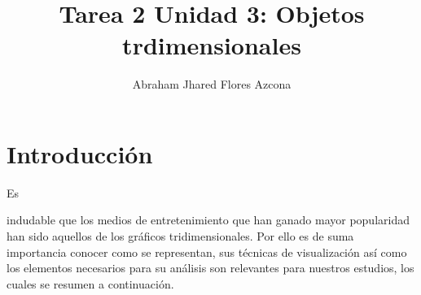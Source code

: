 \documentclass[stu, 12pt, letterpaper, donotrepeattitle, floatsintext, natbib]{apa7}
\title{\Large Tarea 2 Unidad 3: Objetos trdimensionales}
\author{Abraham Jhared Flores Azcona} %
\affiliation{Instituto Tecnológico de Tijuana}
\begin{document}
    \maketitle

    \renewcommand\contentsname{Contenido}
    \tableofcontents
    \renewcommand{\listfigurename}{Figuras}
    \listoffigures

    \newpage
    \section*{Introducción}
    Es \begin{justifying}
        indudable que los medios de entretenimiento que han ganado mayor popularidad han sido aquellos de los gráficos tridimensionales.
        Por ello es de suma importancia conocer como se representan, sus técnicas de visualización así como los elementos necesarios para 
        su análisis son relevantes para nuestros estudios, los cuales se resumen a continuación.\par
    \end{justifying}
    \vspace{\baselineskip}
\end{document}
